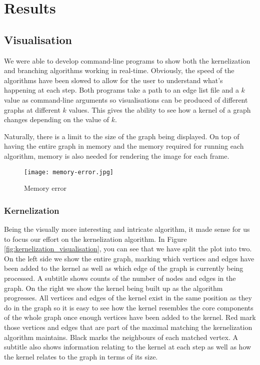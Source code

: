 \section{Results}

\subsection{Visualisation}

We were able to develop command-line programs to show both the kernelization
and branching algorithms working in real-time. Obviously, the speed of the
algorithms have been slowed to allow for the user to understand what's
happening at each step. Both programs take a path to an edge list file and a
\(k\) value as command-line arguments so visualisations can be produced of
different graphs at different \(k\) values. This gives the ability to see how a
kernel of a graph changes depending on the value of \(k\).

Naturally, there is a limit to the size of the graph being displayed. On top of
having the entire graph in memory and the memory required for running each
algorithm, memory is also needed for rendering the image for each frame.

\begin{figure}[htb]
    \centering
    \texttt{[image: memory-error.jpg]}
    \caption{Memory error}
\end{figure}

\subsubsection{Kernelization}

Being the visually more interesting and intricate algorithm, it made sense for
us to focus our effort on the kernelization algorithm. In Figure
\ref{fig:kernelization_visualisation}, you can see that we have split the plot
into two. On the left side we show the entire graph, marking which vertices and
edges have been added to the kernel as well as which edge of the graph is
currently being processed. A subtitle shows counts of the number of nodes and
edges in the graph. On the right we show the kernel being built up as the
algorithm progresses. All vertices and edges of the kernel exist in the same
position as they do in the graph so it is easy to see how the kernel resembles
the core components of the whole graph once enough vertices have been added to
the kernel. Red mark those vertices and edges that are part of the maximal
matching the kernelization algorithm maintains. Black marks the neighbours of
each matched vertex. A subtitle also shows information relating to the kernel
at each step as well as how the kernel relates to the graph in terms of its
size.

